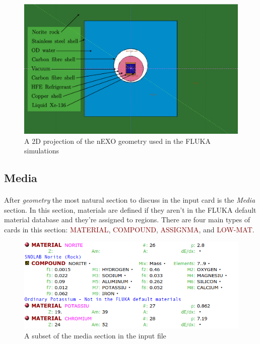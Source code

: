 \documentclass[10pt]{article}
\begin{document}
\begin{figure}[h]
    \begin{center}
    \includegraphics[scale=0.3]{figures/geometry_3.png}
    \caption{A 2D projection of the nEXO geometry used in the FLUKA simulations}
    \label{fig:geometry3}
    \end{center}
\end{figure}

\subsection{Media}
\paragraph{}
After \textit{geometry} the most natural section to discuss in the input card is the \textit{Media} section. In this section, materials are defined if they aren't in the FLUKA default material database and they're assigned to regions. There are four main types of cards in this section: \textcolor{Maroon}{MATERIAL}, \textcolor{Maroon}{COMPOUND}, \textcolor{Maroon}{ASSIGNMA}, and \textcolor{Maroon}{LOW-MAT}. 

\begin{figure}[h]
    \begin{center}
    \includegraphics[scale=0.5]{figures/media_1.png}
    \caption{A subset of the media section in the input file}
    \label{fig:media1}
    \end{center}
\end{figure}
\end{document}
